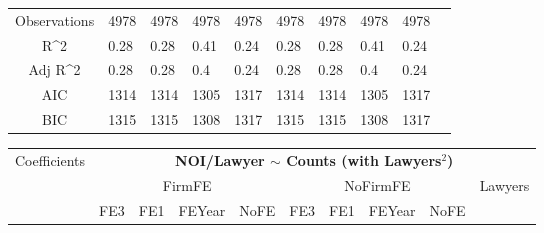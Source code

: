 \documentclass{article}
\begin{document}
\begin{table}[H]
\begin{tabular}{|clllllllll|}
   &  &  &  &  &  &  &  &  & \\ 
  \hline 
 Observations & 4978 & 4978 & 4978 & 4978 & 4978 & 4978 & 4978 & 4978 & \\ 
  R^2 & 0.28 & 0.28 & 0.41 & 0.24 & 0.28 & 0.28 & 0.41 & 0.24 & \\ 
  Adj R^2 & 0.28 & 0.28 & 0.4 & 0.24 & 0.28 & 0.28 & 0.4 & 0.24 & \\ 
  AIC & 1314 & 1314 & 1305 & 1317 & 1314 & 1314 & 1305 & 1317 & \\ 
  BIC & 1315 & 1315 & 1308 & 1317 & 1315 & 1315 & 1308 & 1317 & \\ 
   \hline
\end{tabular}
 
\end{table}


\begin{table}[H]
\centering
\begin{tabular}{|clllllllll|}
\hline
\multirow{3}{*}{Coefficients} & \multicolumn{9}{c|}{\textbf{NOI/Lawyer $\sim$ Counts (with Lawyers$^2$)}} \\
\cline{2-10}
& \multicolumn{4}{c}{FirmFE} & \multicolumn{4}{c}{NoFirmFE} & \multirow{2}{*}{Lawyers} \\
\cline{2-9}
& FE3 & FE1 & FEYear & NoFE & FE3 & FE1 & FEYear & NoFE &  \\
\hline
 

\end{tabular}
\end{table}
\end{document}
